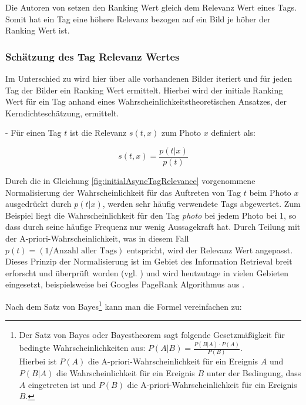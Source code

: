 Die Autoren von \cite{ranking} setzen den Ranking Wert gleich dem Relevanz Wert eines Tags. Somit hat ein Tag eine höhere Relevanz bezogen auf ein Bild je höher der Ranking Wert ist.

\subsubsection{Schätzung des Tag Relevanz Wertes} %
\label{ssub:schaetzung_des_tag_relevanz_wertes}

Im Unterschied zu \cite{collectiveKnowledge} wird hier über alle vorhandenen Bilder iteriert und für jeden Tag der Bilder ein Ranking Wert ermittelt. Hierbei wird der initiale Ranking Wert für ein Tag anhand eines Wahrscheinlichkeitstheoretischen Ansatzes, der Kerndichteschätzung, ermittelt.
 
 - Für einen Tag $t$ ist die Relevanz $s(t, x)$ zum Photo $x$ definiert als:
 \begin{figure}[hptb]
  \begin{equation}
  \label{fig:initialAsyncTagRelevance}
   s(t, x) = \frac{p(t \vert x)}{ p(t) }
  \end{equation}
 \end{figure}
 
Durch die in Gleichung \ref{fig:initialAsyncTagRelevance} vorgenommene Normalisierung der Wahrscheinlichkeit für das Auftreten von Tag $t$ beim Photo $x$ ausgedrückt durch $p(t \vert x)$, werden sehr häufig verwendete Tags abgewertet. Zum Beispiel liegt die Wahrscheinlichkeit für den Tag \emph{photo} bei jedem Photo bei 1, so dass durch seine häufige Frequenz nur wenig Aussagekraft hat. Durch Teilung mit der A-priori-Wahrscheinlichkeit, was in diesem Fall $p(t) = (1 / \text{Anzahl aller Tags})$ entspricht, wird der Relevanz Wert angepasst. Dieses Prinzip der Normalisierung ist im Gebiet des Information Retrieval breit erforscht und überprüft worden (vgl. \cite{bingLiu}) und wird heutzutage in vielen Gebieten eingesetzt, beispielsweise bei Googles PageRank Algorithmus aus \cite{googlePageRank}.
 
Nach dem Satz von Bayes\footnote{Der Satz von Bayes oder Bayestheorem sagt folgende Gesetzmäßigkeit für bedingte Wahrscheinlichkeiten aus: $P(A|B) = \frac{P(B \vert A) \cdot P(A)} {P(B)}$.\\ Hierbei ist $P(A)$ die A-priori-Wahrscheinlichkeit für ein Ereignis $A$ und $P(B \vert A)$ die Wahrscheinlichkeit für ein Ereignis $B$ unter der Bedingung, dass $A$ eingetreten ist und $P(B)$ die A-priori-Wahrscheinlichkeit für ein Ereignis $B$. } kann man die Formel vereinfachen zu:


